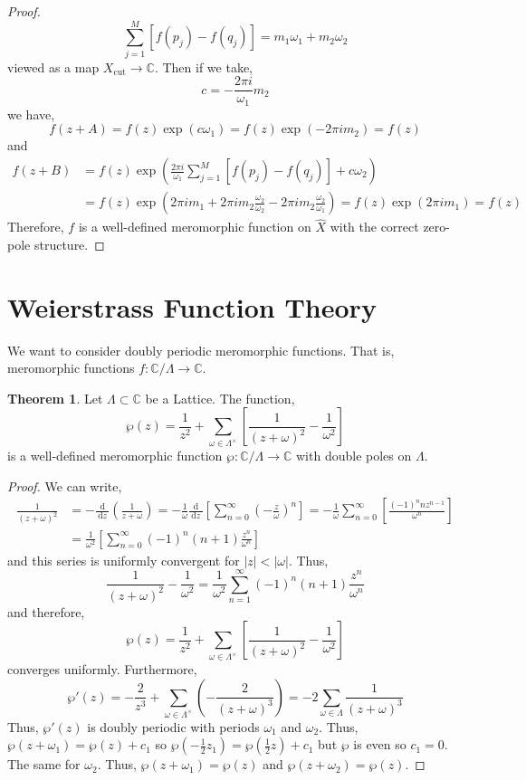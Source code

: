 \documentclass[12pt]{extarticle}
\newcommand{\C}{\mathbb{C}}
\renewcommand{\d}[1]{\: \mathrm{d}#1 \:}
\newcommand{\deriv}[2]{\frac{\d{#1}}{\d{#2}}}
\theoremstyle{definition}
\newtheorem{theorem}{Theorem}[section]
\newcommand{\Xcut}{X_{\text{cut}}}
\begin{document}
\begin{proof}
\[ \sum_{j = 1}^M \left[ f(p_j) - f(q_j) \right] = m_1 \omega_1 + m_2 \omega_2 \]
viewed as a map $\Xcut \to \C$. Then if we take,
\[ c = - \frac{2 \pi i}{\omega_1} m_2 \]
we have,
\[ f(z + A) = f(z) \exp{(c \omega_1)} = f(z) \exp{(-2 \pi i m_2)} = f(z) \]
and 
\begin{align*}
f(z + B) & = f(z) \exp{\left( \frac{2 \pi i}{\omega_1} \sum_{j = 1}^M \left[ f(p_j) - f(q_j) \right] + c \omega_2 \right)} 
\\
& = f(z) \exp{\left( 2 \pi i m_1 + 2 \pi i m_2 \frac{\omega_2}{\omega_2} - 2 \pi i m_2 \frac{\omega_2}{\omega_1} \right)} = f(z) \exp{(2 \pi i m_1)} = f(z)
\end{align*}
Therefore, $f$ is a well-defined meromorphic function on $\hat{X}$ with the correct zero-pole structure. 
\end{proof}

\section{Weierstrass Function Theory}

We want to consider doubly periodic meromorphic functions. That is, meromorphic functions $f : \C / \Lambda \to \C$. 
\begin{theorem}
Let $\Lambda \subset \C$ be a Lattice. The function,
\[ \wp(z) = \frac{1}{z^2} + \sum_{\omega \in \Lambda^\times } \left[ \frac{1}{(z + \omega)^2} - \frac{1}{\omega^2} \right] \]
is a well-defined meromorphic function $\wp : \C / \Lambda \to \C$ with double poles on $\Lambda$. 
\end{theorem}

\begin{proof}
We can write,
\begin{align*} 
\frac{1}{(z + \omega)^2} & = - \deriv{}{z} \left( \frac{1}{z + \omega} \right) = - \frac{1}{\omega} \deriv{}{z} \left[ \sum_{n = 0}^\infty \left( - \frac{z}{\omega} \right)^n \right] = - \frac{1}{\omega} \sum_{n = 0}^\infty \left[ \frac{ (-1)^n n z^{n-1}}{\omega^{n}} \right] 
\\
& = \frac{1}{\omega^2} \left[ \sum_{n = 0}^\infty (-1)^n (n + 1) \frac{z^n}{\omega^n} \right]  
\end{align*}
and this series is uniformly convergent for $|z| < |\omega|$. Thus,
\[ \frac{1}{(z + \omega)^2} - \frac{1}{\omega^2} = \frac{1}{\omega^2} \sum_{n=1}^\infty (-1)^n (n+1) \frac{z^n}{\omega^n} \]
and therefore, 
\[ \wp(z) = \frac{1}{z^2} + \sum_{\omega \in \Lambda^\times} \left[ \frac{1}{(z + \omega)^2} - \frac{1}{\omega^2} \right] \]
converges uniformly. Furthermore, 
\[ \wp'(z) = - \frac{2}{z^3} + \sum_{\omega \in \Lambda^\times} \left( - \frac{2}{(z + \omega)^3} \right) = - 2 \sum_{\omega \in \Lambda} \frac{1}{(z + \omega)^3} \]
Thus, $\wp'(z)$ is doubly periodic with periods $\omega_1$ and $\omega_2$. Thus, $\wp(z + \omega_1) = \wp(z) + c_1$ so $\wp(-\tfrac{1}{2} z_1) = \wp(\tfrac{1}{2} z) + c_1$ but $\wp$ is even so $c_1 = 0$. The same for $\omega_2$. Thus, $\wp(z + \omega_1) = \wp(z)$ and $\wp(z + \omega_2) = \wp(z)$. 
\end{proof}
\end{document}
